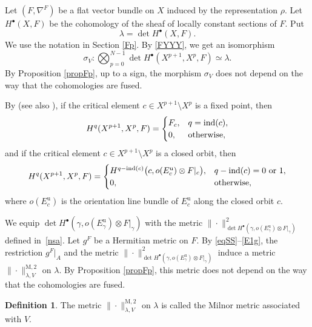 \documentclass[JEP,XML,SOM,Unicode]{cedram}
\newcommand{\sbullet}{{\scriptscriptstyle\bullet}}
\newcommand{\ru}{\mathrm{u}}
\newcommand{\rM}{\mathrm{M}}
\theoremstyle{plain}
\theoremstyle{definition}
\newtheorem{defin}[lem]{Definition}
\theoremstyle{remark}
\DeclareMathOperator{\ind}{ind}
\begin{document}
Let $(F,\nabla^{F})$ be a flat vector bundle on $X$ induced by the representation
$\rho$.
Let $H^{\sbullet}(X,F)$ be the cohomology of the sheaf of locally constant
sections of $F$. Put
\begin{equation}\label{eqlambda}
\lambda=\det H^{\sbullet}(X,F).
\end{equation}
We use the notation in Section \ref{Fp}. By \eqref{FYYY}, we get an isomorphism
\begin{equation}\label{eqSS}
\sigma_{V}:\bigotimes_{p=0}^{N-1}\det
H^{\sbullet}(X^{p+1},X^{p},F)\simeq \lambda.
\end{equation}
By Proposition \ref{propFp}, up to a sign, the
morphism $\sigma_{V}$ does not depend on the way that the
cohomologies are fused.

By \cite[Th.\,9.11]{Franks1982} (see also \cite[\S 2]{MorgadoMorseSmale}), if the critical element $c\in
X^{p+1}\setminus X^{p}$ is a fixed
point, then
\begin{equation}\label{E1x}
H^{q}(X^{p+1},X^{p},F)=
\begin{cases}
F_{c},& q=\ind (c),\\
0,&\hbox{otherwise},
\end{cases}
\end{equation}
and if the critical element $c\in
X^{p+1}\setminus X^{p}$ is a closed orbit, then
\begin{equation}\label{E1g}
H^{q}(X^{p+1},X^{p},F)=
\begin{cases}
H^{q-\ind (c)}\big(c,o(E^{\ru}_{c})\otimes F|_{c}\big),& q-\ind( c)=0
\hbox{ or }1,\\
0,&\hbox{otherwise,}
\end{cases}
\end{equation}
where $o(E_{c}^{\ru})$ is the orientation line bundle of $E^{\ru}_{c}$ along the
closed orbit $c$.

We equip $\det
H^{\sbullet}(\gamma,o(E^{\ru}_{\gamma})\otimes
F|_{\gamma})$ with the metric $\|{\cdot}\|^{2}_{\det
H^{\sbullet}(\gamma,o(E^{\ru}_{\gamma})\otimes
F|_{\gamma})}$ defined in~\eqref{nsa}.
Let $g^{F}$ be a Hermitian metric on $F$. By \eqref{eqSS}--\eqref{E1g}, the
restriction $g^{F}|_{A}$
and the metric $\|{\cdot}\|^{2}_{\det
H^{\sbullet}(\gamma,o(E^{\ru}_{\gamma})\otimes
F|_{\gamma})}$ induce a metric
$\|{\cdot}\|^{\rM,2}_{\lambda,V}$ on
$\lambda$. By Proposition \ref{propFp},
this metric does not depend on the way that the
cohomologies are fused.

\begin{defin}
The metric $\|{\cdot}\|^{\rM,2}_{\lambda,V}$ on
$\lambda$ is called the Milnor metric associated with $V$.
\end{defin}
\end{document}
